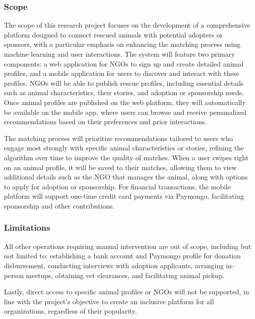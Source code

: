         \subsubsection{Scope}
             The scope of this research project focuses on the development of a comprehensive platform designed to connect rescued animals with potential adopters or sponsors, with a particular emphasis on enhancing the matching process using machine learning and user interactions. The system will feature two primary components: a web application for NGOs to sign up and create detailed animal profiles, and a mobile application for users to discover and interact with these profiles. NGOs will be able to publish rescue profiles, including essential details such as animal characteristics, their stories, and adoption or sponsorship needs. Once animal profiles are published on the web platform, they will automatically be available on the mobile app, where users can browse and receive personalized 
             recommendations based on their preferences and prior interactions.

            The matching process will prioritize recommendations tailored to users who engage most strongly with specific animal characteristics or stories, refining the algorithm over time to improve the quality of matches. When a user swipes right on an animal profile, it will be saved to their matches, allowing them to view additional details such as the NGO that manages the animal, along with options to apply for adoption or sponsorship. For financial transactions, the mobile platform will support one-time credit card payments via Paymongo, facilitating sponsorship and other contributions.
        \subsubsection{Limitations}
            All other operations requiring manual intervention are out of scope, including but not limited to: establishing a bank account and Paymongo profile for donation disbursement, conducting interviews with adoption applicants, arranging in-person meetups, obtaining vet clearances, and facilitating animal pickup.

            Lastly, direct access to specific animal profiles or NGOs will not be supported, in line with the project’s objective to create an inclusive platform for all organizations, regardless of their popularity.
